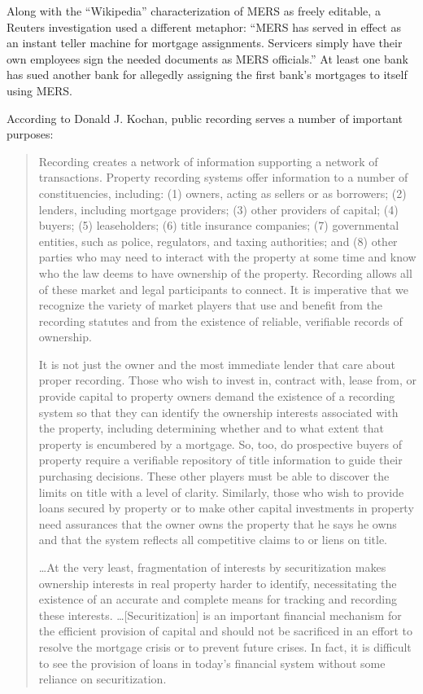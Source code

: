 \item Along with the ``Wikipedia'' characterization of MERS as freely editable,
a Reuters investigation used a different metaphor: ``MERS has served in effect
as an instant teller machine for mortgage assignments. Servicers simply have
their own employees sign the needed documents as MERS officials.'' At least
one bank has sued another bank for allegedly assigning the first bank's
mortgages to itself using MERS.


\item According to Donald J. Kochan, public recording serves a number of
important purposes:
\begin{quotation}
Recording creates a network of information supporting a network of transactions.
Property recording systems offer information to a number of constituencies,
including: (1) owners, acting as sellers or as borrowers; (2) lenders,
including mortgage providers; (3) other providers of capital; (4) buyers; (5)
leaseholders; (6) title insurance companies; (7) governmental entities, such as
police, regulators, and taxing authorities; and (8) other parties who may need
to interact with the property at some time and know who the law deems to have
ownership of the property. Recording allows all of these market and legal
participants to connect. It is imperative that we recognize the variety of
market players that use and benefit from the recording statutes and from the
existence of reliable, verifiable records of ownership. 

It is not just the owner and the most immediate lender that care about proper
recording. Those who wish to invest in, contract with, lease from, or provide
capital to property owners demand the existence of a recording system so that
they can identify the ownership interests associated with the property,
including determining whether and to what extent that property is encumbered by
a mortgage. So, too, do prospective buyers of property require a verifiable
repository of title information to guide their purchasing decisions. These
other players must be able to discover the limits on title with a level of
clarity. Similarly, those who wish to provide loans secured by property or to
make other capital investments in property need assurances that the owner owns
the property that he says he owns and that the system reflects all competitive
claims to or liens on title. 

 \dots At the very least, fragmentation of interests by securitization makes
ownership interests in real property harder to identify, necessitating the
existence of an accurate and complete means for tracking and recording these
interests. \dots [Securitization] is an important financial mechanism for the
efficient provision of capital and should not be sacrificed in an effort to
resolve the mortgage crisis or to prevent future crises. In fact, it is
difficult to see the provision of loans in today's financial system without
some reliance on securitization. 


\end{quotation}
